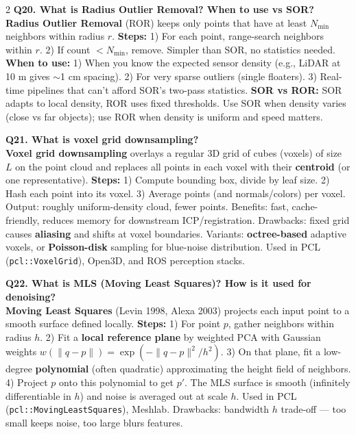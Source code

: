 \begin{paracol}{2}
\textbf{Q20. What is Radius Outlier Removal? When to use vs SOR?}\\
\textbf{Radius Outlier Removal} (ROR) keeps only points that have at least $N_{\min}$ neighbors within radius $r$. \textbf{Steps:} 1) For each point, range-search neighbors within $r$. 2) If count $< N_{\min}$, remove. Simpler than SOR, no statistics needed. \textbf{When to use:} 1) When you know the expected sensor density (e.g., LiDAR at 10 m gives $\sim$1 cm spacing). 2) For very sparse outliers (single floaters). 3) Real-time pipelines that can't afford SOR's two-pass statistics. \textbf{SOR vs ROR:} SOR adapts to local density, ROR uses fixed thresholds. Use SOR when density varies (close vs far objects); use ROR when density is uniform and speed matters.

\textbf{Q21. What is voxel grid downsampling?}\\
\textbf{Voxel grid downsampling} overlays a regular 3D grid of cubes (voxels) of size $L$ on the point cloud and replaces all points in each voxel with their \textbf{centroid} (or one representative). \textbf{Steps:} 1) Compute bounding box, divide by leaf size. 2) Hash each point into its voxel. 3) Average points (and normals/colors) per voxel. Output: roughly uniform-density cloud, fewer points. Benefits: fast, cache-friendly, reduces memory for downstream ICP/registration. Drawbacks: fixed grid causes \textbf{aliasing} and shifts at voxel boundaries. Variants: \textbf{octree-based} adaptive voxels, or \textbf{Poisson-disk} sampling for blue-noise distribution. Used in PCL (\verb|pcl::VoxelGrid|), Open3D, and ROS perception stacks.

\textbf{Q22. What is MLS (Moving Least Squares)? How is it used for denoising?}\\
\textbf{Moving Least Squares} (Levin 1998, Alexa 2003) projects each input point to a smooth surface defined locally. \textbf{Steps:} 1) For point $p$, gather neighbors within radius $h$. 2) Fit a \textbf{local reference plane} by weighted PCA with Gaussian weights $w(\|q-p\|)=\exp(-\|q-p\|^2/h^2)$. 3) On that plane, fit a low-degree \textbf{polynomial} (often quadratic) approximating the height field of neighbors. 4) Project $p$ onto this polynomial to get $p'$. The MLS surface is smooth (infinitely differentiable in $h$) and noise is averaged out at scale $h$. Used in PCL (\verb|pcl::MovingLeastSquares|), Meshlab. Drawbacks: bandwidth $h$ trade-off — too small keeps noise, too large blurs features.


\end{paracol}
